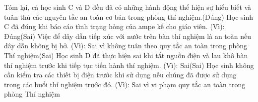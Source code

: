 \begin{ex}
{Tóm lại, cả học sinh C và D đều đã có những hành động thể hiện sự hiểu biết và tuân thủ các nguyên tắc an toàn cơ bản trong phòng thí nghiệm.(Đúng)  Học sinh C đã đúng khi báo cáo tình trạng hỏng của ampe kế cho giáo viên.
(Vì):  Đúng(Sai)  Việc để dây dẫn tiếp xúc với nước trên bàn thí nghiệm là an toàn nếu dây dẫn không bị hở.
(Vì):  Sai vì không tuân theo quy tắc an toàn trong phòng Thí nghiệm(Sai)  Học sinh D đã thực hiện sai khi tắt nguồn điện và lau khô bàn thí nghiệm trước khi tiếp tục tiến hành thí nghiệm.
(Vì):  Sai(Sai)  Học sinh không cần kiểm tra các thiết bị điện trước khi sử dụng nếu chúng đã được sử dụng trong các buổi thí nghiệm trước đó.
(Vì):  Sai vì vi phạm quy tắc an toàn trong phòng Thí nghiệm}
\end{ex}

